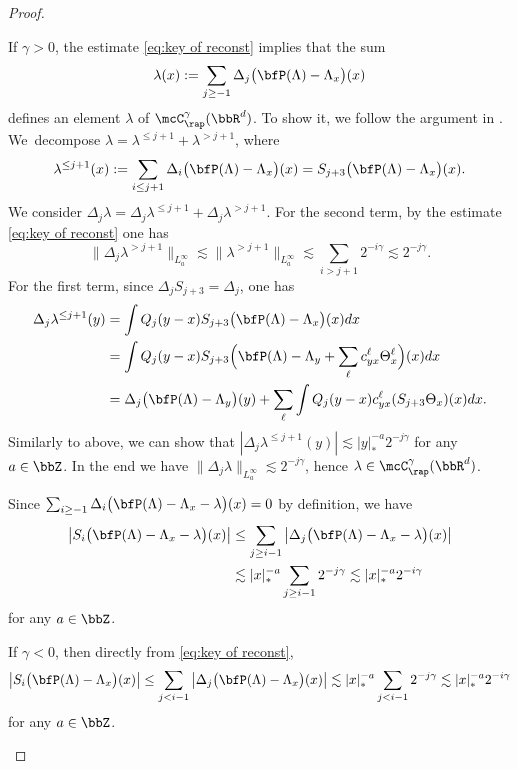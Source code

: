 \begin{proof}
\begin{enumeratei}
\item
If $\gamma>0$, the estimate \eqref{eq:key of reconst} implies that the sum
\[
\lambda(x):=\sum_{j\ge-1}\Delta_j\bigl(\bfP(\Lambda)-\Lambda_x\bigr)(x)
\]
defines an element $\lambda$ of $\mcC_{\rap}^\gamma(\bbR^d)$.
To show it, we follow the argument in \cite[\S6]{GIP}.
We~decompose $\lambda=\lambda^{\le j+1}+\lambda^{>j+1}$, where
\[
\lambda^{\le j+1}(x):=\sum_{i\le j+1}\Delta_i\bigl(\bfP(\Lambda)-\Lambda_x\bigr)(x)
=S_{j+3}\bigl(\bfP(\Lambda)-\Lambda_x\bigr)(x).
\]
We consider $\Delta_j\lambda=\Delta_j\lambda^{\le j+1}+\Delta_j\lambda^{>j+1}$.
For the second term, by the estimate \eqref{eq:key of reconst} one has
\[
\|\Delta_j\lambda^{>j+1}\|_{L_a^\infty}
\lesssim\|\lambda^{>j+1}\|_{L_a^\infty}
\lesssim\sum_{i>j+1}2^{-i\gamma}\lesssim2^{-j\gamma}.
\]
For the first term, since $\Delta_jS_{j+3}=\Delta_j$, one has
\begin{align*}
\Delta_j\lambda^{\le j+1}(y)
&=\int Q_j(y-x)S_{j+3}\bigl(\bfP(\Lambda)-\Lambda_x\bigr)(x)dx\\
&=\int Q_j(y-x)S_{j+3}\Bigl(\bfP(\Lambda)-\Lambda_y+\sum_\ell c_{yx}^\ell\Theta_x^\ell\Bigr)(x)dx\\
&=\Delta_j\bigl(\bfP(\Lambda)-\Lambda_y\bigr)(y)+\sum_\ell\int Q_j(y-x)c_{yx}^\ell (S_{j+3}\Theta_x)(x)dx.
\end{align*}
Similarly to above, we can show that $|\Delta_j\lambda^{\le j+1}(y)|\lesssim|y|_*^{-a}2^{-j\gamma}$ for any $a\in\bbZ$.
In the end we have $\|\Delta_j\lambda\|_{L_a^\infty}\lesssim2^{-j\gamma}$, hence $\lambda\in\mcC_\rap^\gamma(\bbR^d)$.

Since $\sum_{i\ge-1}\Delta_i\bigl(\bfP(\Lambda)-\Lambda_x-\lambda\bigr)(x)=0$ by definition, we have
\begin{align*}
\big| S_i\bigl(\bfP(\Lambda)-\Lambda_x-\lambda\bigr)(x) \big|
&\le\sum_{j\ge i-1}\big| \Delta_j\bigl(\bfP(\Lambda)-\Lambda_x-\lambda\bigr)(x) \big|\\
&\lesssim|x|_*^{-a}\sum_{j\ge i-1}2^{-j\gamma}\lesssim|x|_*^{-a}2^{-i\gamma}
\end{align*}
for any $a\in\bbZ$.

\item
If $\gamma<0$, then directly from \eqref{eq:key of reconst},
\begin{align*}
\big| S_i\bigl(\bfP(\Lambda)-\Lambda_x\bigr)(x) \big|
\le\sum_{j< i-1}\big| \Delta_j\bigl(\bfP(\Lambda)-\Lambda_x\bigr)(x) \big|
\lesssim|x|_*^{-a}\sum_{j< i-1}2^{-j\gamma}\lesssim|x|_*^{-a}2^{-i\gamma}
\end{align*}
for any $a\in\bbZ$.\qedhere
\end{enumeratei}
\end{proof}

